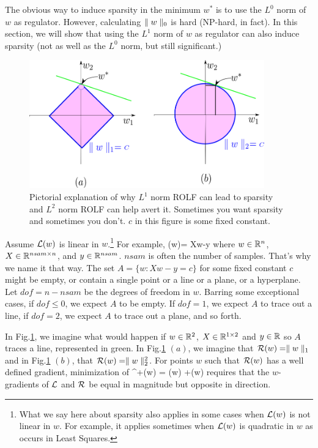 The obvious way to induce sparsity in
the minimum $w^*$ is to use the $L^0$ norm of $w$ as regulator.
However, calculating $\parallel w\parallel_0$ is
hard (NP-hard, in fact). In this section, we will
show that using the $L^1$ norm
of $w$ as regulator can also induce sparsity (not as well as the
$L^0$ norm, but still significant.)
\begin{figure}[h!]
\centering
\includegraphics[width=4in]
{regularization/sparsity.png}
\caption{Pictorial explanation of
why $L^1$ norm ROLF can lead to sparsity
and $L^2$ norm ROLF can help avert it. Sometimes
you want sparsity and sometimes you don't. $c$ in this figure is some
fixed constant.
}
\label{fig-sparsity}
\end{figure}

Assume ${\cal L}(w)$ is linear in $w$.\footnote{What we say here about sparsity also applies in some cases when ${\cal L}(w)$ is not linear in $w$. For example, it applies sometimes when ${\cal L}(w)$
is quadratic in $w$ as occurs in Least Squares.}
For example,
\beq
\call(w)= Xw-y
\eeq
where $w\in{ \mathbb{R}}^n$, $X\in { \mathbb{R}}^{nsam\times n}$,  and $y\in{ \mathbb{R}}^{nsam}$.
$nsam$ is often the number of samples. That's why we name it that way.
The set $A=\{w: Xw-y=c\}$ for some fixed constant $c$  might be empty,
or contain a single point or a line or a plane, or a hyperplane. Let $dof=n-nsam$
be the degrees  of freedom in $w$.
Barring some exceptional cases, if $dof\leq 0$, we expect $A$ to be empty.
If $dof=1$, we expect $A$ to trace out a line, if $dof= 2$, we expect $A$ to
trace out a plane, and so forth.

In Fig.\ref{fig-sparsity}, we imagine
what would happen if
$w\in { \mathbb{R}}^2$, $X\in { \mathbb{R}}^{1\times 2}$
and $y\in { \mathbb{R}}$ so $A$ traces a line,
represented in green.
In Fig.\ref{fig-sparsity} $(a)$,
we imagine that ${\cal R}(w)=\parallel w\parallel_1$
and in Fig.\ref{fig-sparsity} $(b)$, that
${\cal R}(w)=\parallel w\parallel_2^2$.
For points $w$ such that ${\cal R}(w)$
has a well defined gradient,
minimization of
\beq
\call^+(w) = \call(w) +\calr(w)
\eeq
requires that the $w$-gradients of
${\cal L}$ and ${\cal R}$ be equal in magnitude but opposite in direction.

